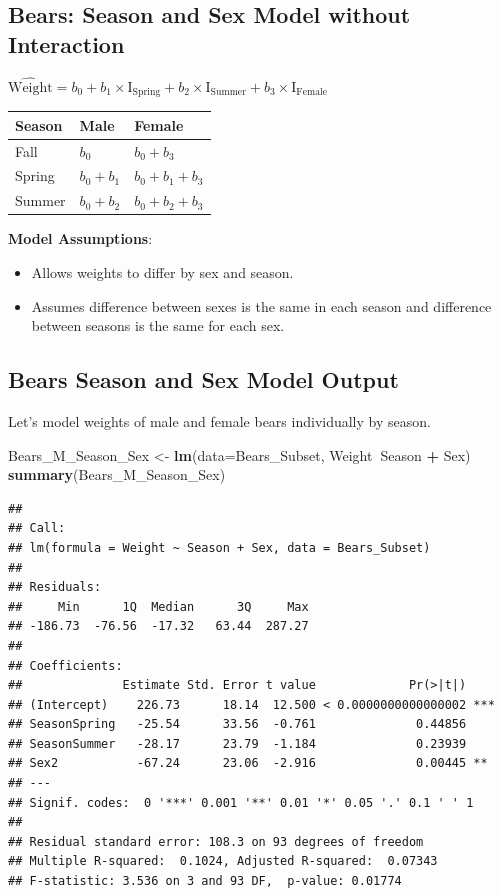 \documentclass[]{book}
\newenvironment{Shaded}{\begin{snugshade}}{\end{snugshade}}
\newcommand{\KeywordTok}[1]{\textcolor[rgb]{0.13,0.29,0.53}{\textbf{#1}}}
\newcommand{\DataTypeTok}[1]{\textcolor[rgb]{0.13,0.29,0.53}{#1}}
\newcommand{\StringTok}[1]{\textcolor[rgb]{0.31,0.60,0.02}{#1}}
\newcommand{\OperatorTok}[1]{\textcolor[rgb]{0.81,0.36,0.00}{\textbf{#1}}}
\newcommand{\NormalTok}[1]{#1}
\providecommand{\tightlist}{%
  \setlength{\itemsep}{0pt}\setlength{\parskip}{0pt}}
\begin{document}
\subsection{Bears: Season and Sex Model without
Interaction}\label{bears-season-and-sex-model-without-interaction}

\(\widehat{\text{Weight}} = b_0+b_1\times\text{I}_{\text{Spring}}+b_2\times\text{I}_{\text{Summer}} + b_3\times\text{I}_{\text{Female}}\)

\begin{longtable}[]{@{}lll@{}}
\toprule
Season & Male & Female\tabularnewline
\midrule
\endhead
Fall & \(b_0\) & \(b_0 + b_3\)\tabularnewline
Spring & \(b_0 + b_1\) & \(b_0 + b_1+ b_3\)\tabularnewline
Summer & \(b_0 + b_2\) & \(b_0 + b_2+ b_3\)\tabularnewline
\bottomrule
\end{longtable}

\textbf{Model Assumptions}:

\begin{itemize}
\tightlist
\item
  Allows weights to differ by sex and season.\\
\item
  Assumes difference between sexes is the same in each season and
  difference between seasons is the same for each sex.
\end{itemize}

\subsection{Bears Season and Sex Model
Output}\label{bears-season-and-sex-model-output}

Let's model weights of male and female bears individually by season.

\begin{Shaded}
\begin{Highlighting}[]
\NormalTok{Bears_M_Season_Sex <-}\StringTok{ }\KeywordTok{lm}\NormalTok{(}\DataTypeTok{data=}\NormalTok{Bears_Subset, Weight}\OperatorTok{~}\NormalTok{Season }\OperatorTok{+}\StringTok{ }\NormalTok{Sex)}
\KeywordTok{summary}\NormalTok{(Bears_M_Season_Sex)}
\end{Highlighting}
\end{Shaded}

\begin{verbatim}
## 
## Call:
## lm(formula = Weight ~ Season + Sex, data = Bears_Subset)
## 
## Residuals:
##     Min      1Q  Median      3Q     Max 
## -186.73  -76.56  -17.32   63.44  287.27 
## 
## Coefficients:
##              Estimate Std. Error t value             Pr(>|t|)    
## (Intercept)    226.73      18.14  12.500 < 0.0000000000000002 ***
## SeasonSpring   -25.54      33.56  -0.761              0.44856    
## SeasonSummer   -28.17      23.79  -1.184              0.23939    
## Sex2           -67.24      23.06  -2.916              0.00445 ** 
## ---
## Signif. codes:  0 '***' 0.001 '**' 0.01 '*' 0.05 '.' 0.1 ' ' 1
## 
## Residual standard error: 108.3 on 93 degrees of freedom
## Multiple R-squared:  0.1024, Adjusted R-squared:  0.07343 
## F-statistic: 3.536 on 3 and 93 DF,  p-value: 0.01774
\end{verbatim}
\end{document}
